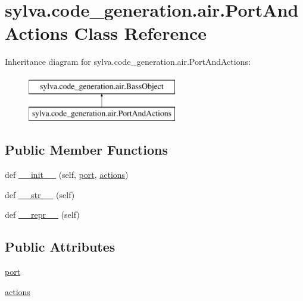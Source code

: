 \hypertarget{classsylva_1_1code__generation_1_1air_1_1_port_and_actions}{}\section{sylva.\+code\+\_\+generation.\+air.\+Port\+And\+Actions Class Reference}
\label{classsylva_1_1code__generation_1_1air_1_1_port_and_actions}
Inheritance diagram for sylva.\+code\+\_\+generation.\+air.\+Port\+And\+Actions\+:\begin{figure}[H]
\begin{center}
\leavevmode
\includegraphics[height=2.000000cm]{classsylva_1_1code__generation_1_1air_1_1_port_and_actions}
\end{center}
\end{figure}
\subsection*{Public Member Functions}
\begin{DoxyCompactItemize}
\item 
def \hyperlink{classsylva_1_1code__generation_1_1air_1_1_port_and_actions_a099f5352bd153f64b013fe50a8358308}{\+\_\+\+\_\+init\+\_\+\+\_\+} (self, \hyperlink{classsylva_1_1code__generation_1_1air_1_1_port_and_actions_a6b5a21780c1b3cc8879c05a5dfdd65bf}{port}, \hyperlink{classsylva_1_1code__generation_1_1air_1_1_port_and_actions_aaeb765c205fcb8c38025428542025ba7}{actions})
\item 
def \hyperlink{classsylva_1_1code__generation_1_1air_1_1_bass_object_a2c164720220479369c29db97b67aabe8}{\+\_\+\+\_\+str\+\_\+\+\_\+} (self)
\item 
def \hyperlink{classsylva_1_1code__generation_1_1air_1_1_bass_object_a17548b84b2a55240a429506aed418292}{\+\_\+\+\_\+repr\+\_\+\+\_\+} (self)
\end{DoxyCompactItemize}
\subsection*{Public Attributes}
\begin{DoxyCompactItemize}
\item 
\hyperlink{classsylva_1_1code__generation_1_1air_1_1_port_and_actions_a6b5a21780c1b3cc8879c05a5dfdd65bf}{port}
\item 
\hyperlink{classsylva_1_1code__generation_1_1air_1_1_port_and_actions_aaeb765c205fcb8c38025428542025ba7}{actions}
\end{DoxyCompactItemize}


